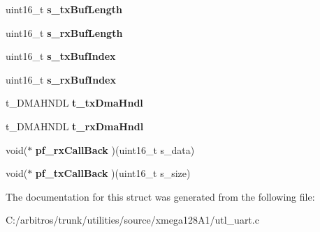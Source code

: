 \begin{DoxyCompactItemize}
\item 
\hypertarget{structt__uart_chan_hndl_a767993f68789d66ae3fe8489cd617aa9}{uint16\-\_\-t {\bfseries s\-\_\-tx\-Buf\-Length}}\label{structt__uart_chan_hndl_a767993f68789d66ae3fe8489cd617aa9}

\item 
\hypertarget{structt__uart_chan_hndl_a739af0f11f08a36f39f6706dacf2b960}{uint16\-\_\-t {\bfseries s\-\_\-rx\-Buf\-Length}}\label{structt__uart_chan_hndl_a739af0f11f08a36f39f6706dacf2b960}

\item 
\hypertarget{structt__uart_chan_hndl_a33e072de86cbc01ab4d6d9f2704e7027}{uint16\-\_\-t {\bfseries s\-\_\-tx\-Buf\-Index}}\label{structt__uart_chan_hndl_a33e072de86cbc01ab4d6d9f2704e7027}

\item 
\hypertarget{structt__uart_chan_hndl_a6c0046973f62883d256c19f70b7a8fe7}{uint16\-\_\-t {\bfseries s\-\_\-rx\-Buf\-Index}}\label{structt__uart_chan_hndl_a6c0046973f62883d256c19f70b7a8fe7}

\item 
\hypertarget{structt__uart_chan_hndl_a9841596d010decd729f14ee9aad7b2c8}{t\-\_\-\-D\-M\-A\-H\-N\-D\-L {\bfseries t\-\_\-tx\-Dma\-Hndl}}\label{structt__uart_chan_hndl_a9841596d010decd729f14ee9aad7b2c8}

\item 
\hypertarget{structt__uart_chan_hndl_a8ebbb56a16a0125906b1c87368aef8ee}{t\-\_\-\-D\-M\-A\-H\-N\-D\-L {\bfseries t\-\_\-rx\-Dma\-Hndl}}\label{structt__uart_chan_hndl_a8ebbb56a16a0125906b1c87368aef8ee}

\item 
\hypertarget{structt__uart_chan_hndl_a4ffd88bed41f1da8921e72accab66d34}{void($\ast$ {\bfseries pf\-\_\-rx\-Call\-Back} )(uint16\-\_\-t s\-\_\-data)}\label{structt__uart_chan_hndl_a4ffd88bed41f1da8921e72accab66d34}

\item 
\hypertarget{structt__uart_chan_hndl_a918a799f0692184162f4c5dbe8e893f0}{void($\ast$ {\bfseries pf\-\_\-tx\-Call\-Back} )(uint16\-\_\-t s\-\_\-size)}\label{structt__uart_chan_hndl_a918a799f0692184162f4c5dbe8e893f0}

\end{DoxyCompactItemize}


The documentation for this struct was generated from the following file\-:\begin{DoxyCompactItemize}
\item 
C\-:/arbitros/trunk/utilities/source/xmega128\-A1/utl\-\_\-uart.\-c\end{DoxyCompactItemize}
